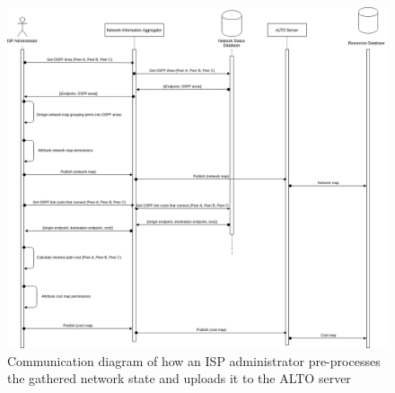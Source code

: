 \begin{figure}[!h]
        \centering
        \includegraphics[scale=0.3]{img/info-provisioning-isp.png}
        \caption{Communication diagram of how an ISP administrator pre-processes the gathered network state and uploads it to the ALTO server}
        \label{fig:architecture-network}
\end{figure}

